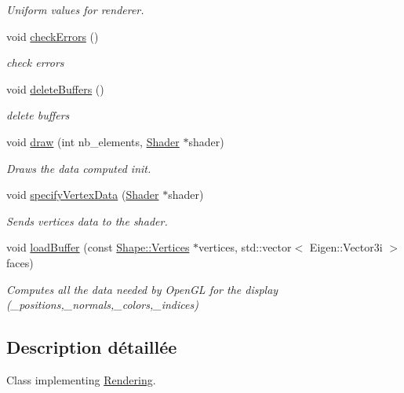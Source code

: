 \begin{DoxyCompactItemize}
\begin{DoxyCompactList}\small\item\em Uniform values for renderer. \end{DoxyCompactList}\item 
void \hyperlink{class_rendering___open_g_l_a9621079239b6b621dfc8f9c4e93bdd7a}{check\+Errors} ()
\begin{DoxyCompactList}\small\item\em check errors \end{DoxyCompactList}\item 
void \hyperlink{class_rendering___open_g_l_aab5b195bb52751243f4944417f9ae7d5}{delete\+Buffers} ()
\begin{DoxyCompactList}\small\item\em delete buffers \end{DoxyCompactList}\item 
void \hyperlink{class_rendering___open_g_l_a94abb636d4264637628e4b9b97c087d2}{draw} (int nb\+\_\+elements, \hyperlink{class_shader}{Shader} $\ast$shader)
\begin{DoxyCompactList}\small\item\em Draws the data computed init. \end{DoxyCompactList}\item 
void \hyperlink{class_rendering___open_g_l_a8ad1a3e698d694782f4174d94b745cd5}{specify\+Vertex\+Data} (\hyperlink{class_shader}{Shader} $\ast$shader)
\begin{DoxyCompactList}\small\item\em Sends vertices data to the shader. \end{DoxyCompactList}\item 
void \hyperlink{class_rendering___open_g_l_aee7a6085edb4e6927282067b6cde59bf}{load\+Buffer} (const \hyperlink{struct_shape_1_1_vertices}{Shape\+::\+Vertices} $\ast$vertices, std\+::vector$<$ Eigen\+::\+Vector3i $>$ faces)
\begin{DoxyCompactList}\small\item\em Computes all the data needed by Open\+GL for the display (\+\_\+positions,\+\_\+normals,\+\_\+colors,\+\_\+indices) \end{DoxyCompactList}\end{DoxyCompactItemize}


\subsection{Description détaillée}
Class implementing \hyperlink{class_rendering}{Rendering}. 


